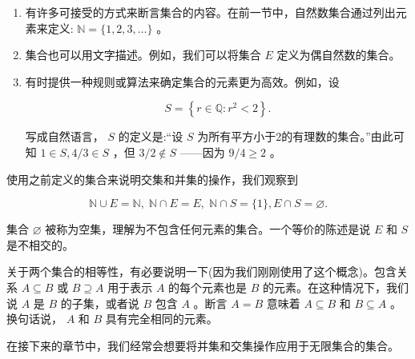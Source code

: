 \begin{Eg}
  \label{eg:1.2.1}
  \begin{enumerate}[label = (\roman*)]
  \item 有许多可接受的方式来断言集合的内容。在前一节中，自然数集合通过列出元素来定义: \(\mathbb{N} = \{ 1,2,3,\ldots \}\) 。
  \item 集合也可以用文字描述。例如，我们可以将集合 \(E\) 定义为偶自然数的集合。
  \item 有时提供一种规则或算法来确定集合的元素更为高效。例如，设

\[
S = \left\{  {r \in  \mathbb{Q} : {r}^{2} < 2}\right\}  .
\]

写成自然语言， \(S\) 的定义是:“设 \(S\) 为所有平方小于2的有理数的集合。”由此可知 \(1 \in  S,4/3 \in  S\) ，但 \(3/2 \notin  S\) ——因为 \(9/4 \geq  2\) 。
  \end{enumerate}
\end{Eg}
 
使用之前定义的集合来说明交集和并集的操作，我们观察到

\[
\mathbb{N} \cup  E = \mathbb{N},\;\mathbb{N} \cap  E = E,\;\mathbb{N} \cap  S = \{ 1\} ,E \cap  S = \varnothing .
\]

集合 \(\varnothing\) 被称为空集，理解为不包含任何元素的集合。一个等价的陈述是说 \(E\) 和 \(S\) 是不相交的。

关于两个集合的相等性，有必要说明一下(因为我们刚刚使用了这个概念)。包含关系 \(A \subseteq  B\) 或 \(B \supseteq  A\) 用于表示 \(A\) 的每个元素也是 \(B\) 的元素。在这种情况下，我们说 \(A\) 是 \(B\) 的子集，或者说 \(B\) 包含 \(A\) 。断言 \(A = B\) 意味着 \(A \subseteq  B\) 和 \(B \subseteq  A\) 。换句话说， \(A\) 和 \(B\) 具有完全相同的元素。

在接下来的章节中，我们经常会想要将并集和交集操作应用于无限集合的集合。

